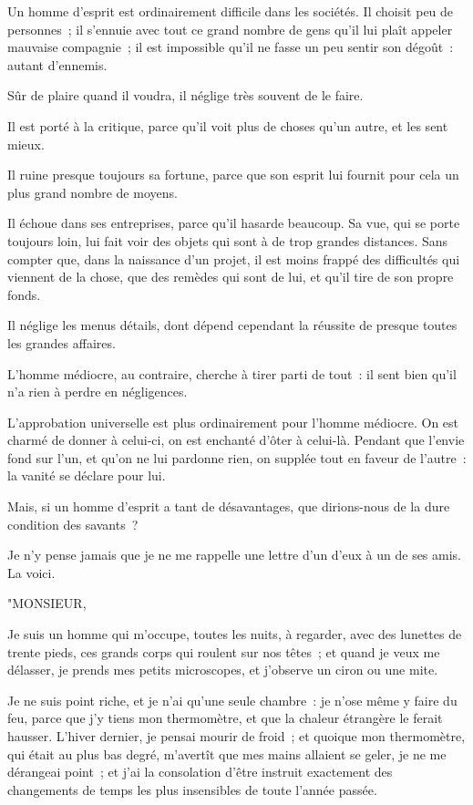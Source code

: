\documentclass[french,twoside]{book} %
\begin{document}
\noindent Un homme d’esprit est ordinairement difficile dans les sociétés. Il choisit peu de personnes ; il s’ennuie avec tout ce grand nombre de gens qu’il lui plaît appeler mauvaise compagnie ; il est impossible qu’il ne fasse un peu sentir son dégoût : autant d’ennemis.\par
Sûr de plaire quand il voudra, il néglige très souvent de le faire.\par
Il est porté à la critique, parce qu’il voit plus de choses qu’un autre, et les sent mieux.\par
Il ruine presque toujours sa fortune, parce que son esprit lui fournit pour cela un plus grand nombre de moyens.\par
Il échoue dans ses entreprises, parce qu’il hasarde beaucoup. Sa vue, qui se porte toujours loin, lui fait voir des objets qui sont à de trop grandes distances. Sans compter que, dans la naissance d’un projet, il est moins frappé des difficultés qui viennent de la chose, que des remèdes qui sont de lui, et qu’il tire de son propre fonds.\par
Il néglige les menus détails, dont dépend cependant la réussite de presque toutes les grandes affaires.\par
L’homme médiocre, au contraire, cherche à tirer parti de tout : il sent bien qu’il n’a rien à perdre en négligences.\par
L’approbation universelle est plus ordinairement pour l’homme médiocre. On est charmé de donner à celui-ci, on est enchanté d’ôter à celui-là. Pendant que l’envie fond sur l’un, et qu’on ne lui pardonne rien, on supplée tout en faveur de l’autre : la vanité se déclare pour lui.\par
Mais, si un homme d’esprit a tant de désavantages, que dirions-nous de la dure condition des savants ?\par
Je n’y pense jamais que je ne me rappelle une lettre d’un d’eux à un de ses amis. La voici.\par
"MONSIEUR,\par
Je suis un homme qui m’occupe, toutes les nuits, à regarder, avec des lunettes de trente pieds, ces grands corps qui roulent sur nos têtes ; et quand je veux me délasser, je prends mes petits microscopes, et j’observe un ciron ou une mite.\par
Je ne suis point riche, et je n’ai qu’une seule chambre : je n’ose même y faire du feu, parce que j’y tiens mon thermomètre, et que la chaleur étrangère le ferait hausser. L’hiver dernier, je pensai mourir de froid ; et quoique mon thermomètre, qui était au plus bas degré, m’avertît que mes mains allaient se geler, je ne me dérangeai point ; et j’ai la consolation d’être instruit exactement des changements de temps les plus insensibles de toute l’année passée.\par
\end{document}

